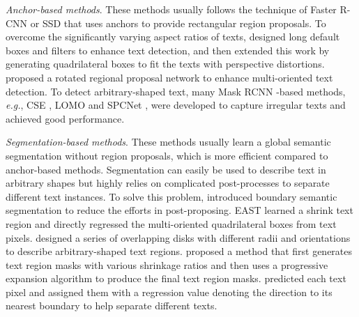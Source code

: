\documentclass[letterpaper]{article} \usepackage{aaai20}  \usepackage{times}  \usepackage{helvet} \usepackage{courier}  \usepackage[hyphens]{url}  \usepackage{graphicx} \urlstyle{rm} \def\UrlFont{\rm}  \usepackage{graphicx}  \frenchspacing  \setlength{\pdfpagewidth}{8.5in}  \setlength{\pdfpageheight}{11in}  \usepackage{amsmath}
\begin{document}
\emph{Anchor-based methods}. These methods usually follows the technique of Faster R-CNN \cite{ren2015faster} or SSD \cite{liu2016ssd} that uses anchors to provide rectangular region proposals.
To overcome the significantly varying aspect ratios of texts, \cite{liao2017textboxes} designed long default boxes and filters to enhance text detection, and then \cite{liao2018textboxess} extended this work by generating quadrilateral boxes to fit the texts with perspective distortions.
\cite{ma2018arbitrary} proposed a rotated regional proposal network to enhance multi-oriented text detection.
To detect arbitrary-shaped text, many Mask RCNN \cite{he2017mask}-based methods, \emph{e.g.}, CSE \cite{liu2019Towards}, LOMO \cite{Zhang2019look} and SPCNet \cite{xie2018scene}, were developed to capture irregular texts and achieved good performance.

\emph{Segmentation-based methods}.
These methods usually learn a global semantic segmentation without region proposals, which is more efficient compared to anchor-based methods. Segmentation can easily be used to describe text in arbitrary shapes but highly relies on complicated post-processes to separate different text instances.
To solve this problem, \cite{wu2017self} introduced boundary semantic segmentation to reduce the efforts in post-proposing.
EAST \cite{zhou2017east} learned a shrink text region and directly regressed the multi-oriented quadrilateral boxes from text pixels.
 \cite{long2018textsnake} designed a series of overlapping disks with different radii and orientations to describe arbitrary-shaped text regions.
 \cite{Wang2019Shape} proposed a method that first generates text region masks with various shrinkage ratios and then uses a progressive expansion algorithm to produce the final text region masks.
 \cite{xu2019textfield} predicted each text pixel and assigned them with a regression value denoting the direction to its nearest boundary to help separate different texts.
\end{document}

